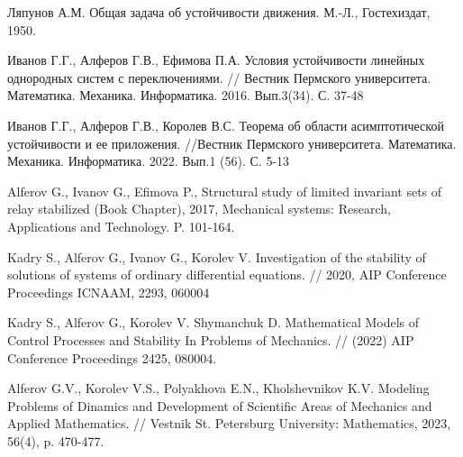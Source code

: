 \begin{thebibliography}{9} %

 Ляпунов А.М. Общая задача об устойчивости движения. М.-Л., Гостехиздат, 1950.

 Иванов Г.Г., Алферов Г.В., Ефимова П.А. Условия устойчивости линейных однородных систем с переключениями. //  Вестник Пермского университета. Математика. Механика. Информатика. 2016. Вып.3(34). С. 37-48

 Иванов Г.Г., Алферов Г.В., Королев В.С.  Теорема об области асимптотической устойчивости и ее приложения.   //Вестник Пермского университета. Математика. Механика. Информатика. 2022. Вып.1 (56). С. 5-13

 Alferov G., Ivanov G., Efimova P., Structural study of limited invariant sets of relay stabilized (Book Chapter), 2017, Mechanical systems: Research, Applications and Technology. P. 101-164.

 Kadry S., Alferov G., Ivanov G., Korolev V. Investigation of the stability of solutions of systems of ordinary differential  equations.   // 2020, AIP Conference  Proceedings  ICNAAM,  2293, 060004

 Kadry S., Alferov G.,  Korolev V. Shymanchuk D. Mathematical  Models of Control  Processes and Stability In Problems of Mechanics. // (2022) AIP Conference Proceedings 2425, 080004.

 Alferov G.V., Korolev V.S., Polyakhova E.N., Kholshevnikov K.V. Modeling Problems of Dinamics and Development of Scientific Areas of Mechanics and Applied Mathematics. // Vestnik St. Petersburg University: Mathematics, 2023, 56(4), p. 470-477.

\end{thebibliography}





% 